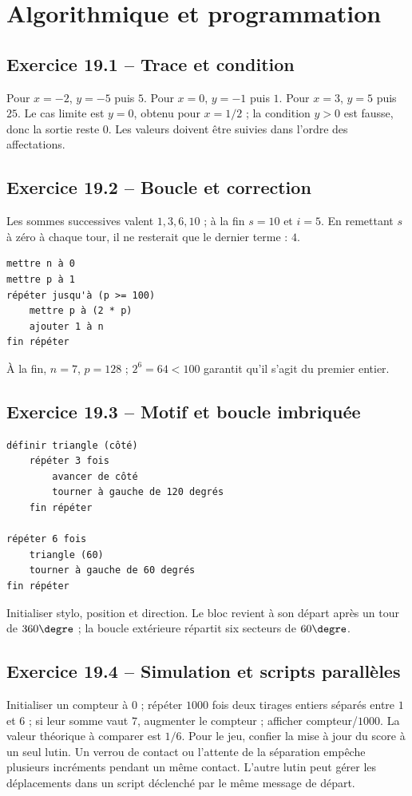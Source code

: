 \chapter{Algorithmique et programmation}
\label{corriges:19}
\section*{Exercice 19.1 -- Trace et condition}
Pour $x=-2$, $y=-5$ puis $5$. Pour $x=0$, $y=-1$ puis $1$. Pour $x=3$, $y=5$ puis $25$. Le cas limite est $y=0$, obtenu pour $x=1/2$ ; la condition $y>0$ est fausse, donc la sortie reste $0$. Les valeurs doivent être suivies dans l'ordre des affectations.

\section*{Exercice 19.2 -- Boucle et correction}
Les sommes successives valent $1,3,6,10$ ; à la fin $s=10$ et $i=5$. En remettant $s$ à zéro à chaque tour, il ne resterait que le dernier terme : $4$.
\begin{lstlisting}
mettre n à 0
mettre p à 1
répéter jusqu'à (p >= 100)
    mettre p à (2 * p)
    ajouter 1 à n
fin répéter
\end{lstlisting}
À la fin, $n=7$, $p=128$ ; $2^6=64<100$ garantit qu'il s'agit du premier entier.

\section*{Exercice 19.3 -- Motif et boucle imbriquée}
\begin{lstlisting}
définir triangle (côté)
    répéter 3 fois
        avancer de côté
        tourner à gauche de 120 degrés
    fin répéter

répéter 6 fois
    triangle (60)
    tourner à gauche de 60 degrés
fin répéter
\end{lstlisting}
Initialiser stylo, position et direction. Le bloc revient à son départ après un tour de $360\degre$ ; la boucle extérieure répartit six secteurs de $60\degre$.

\section*{Exercice 19.4 -- Simulation et scripts parallèles}
Initialiser un compteur à $0$ ; répéter $1000$ fois deux tirages entiers séparés entre $1$ et $6$ ; si leur somme vaut $7$, augmenter le compteur ; afficher compteur/$1000$. La valeur théorique à comparer est $1/6$.
Pour le jeu, confier la mise à jour du score à un seul lutin. Un verrou de contact ou l'attente de la séparation empêche plusieurs incréments pendant un même contact. L'autre lutin peut gérer les déplacements dans un script déclenché par le même message de départ.
